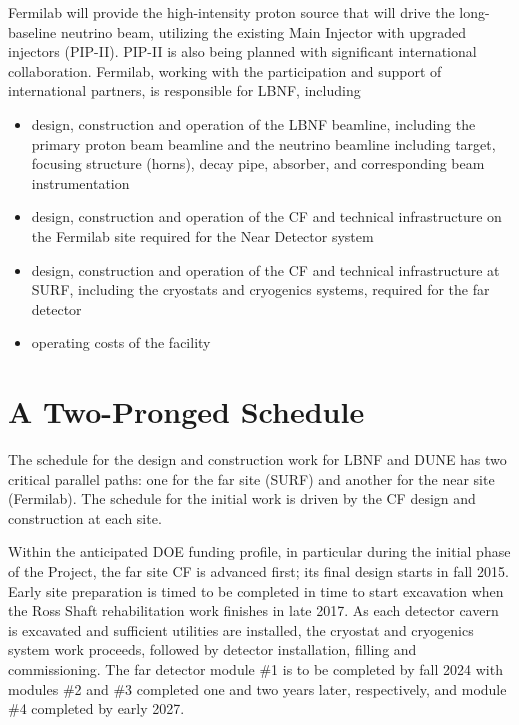 Fermilab will provide the high-intensity proton source that will drive the long-baseline neutrino beam, utilizing the existing Main Injector with upgraded injectors (PIP-II).  PIP-II is also being planned with significant international collaboration.  Fermilab, working %
with the participation and support of international partners, is responsible for %
LBNF, including
\begin{itemize}
\item design, construction and operation of the LBNF beamline, including the primary proton beam beamline and the neutrino beamline including target, focusing structure (horns), decay pipe, absorber, and corresponding beam instrumentation
\item design, construction and operation of the CF and technical infrastructure on the Fermilab site required for the Near Detector system
\item design, construction and operation of the CF and technical infrastructure %
at SURF, including the cryostats and cryogenics systems, required for the far detector
\item %
operating costs of the facility
\end{itemize}


\section{A Two-Pronged Schedule} %

The schedule for the design and construction work for LBNF and DUNE has two critical parallel paths: one for the %
far site (SURF) and %
another for the %
near site (Fermilab). The schedule for the initial work is driven by the CF design and construction at each site. 

Within the anticipated DOE funding profile, in particular during the initial phase of the Project, the far site CF is advanced first; its final design starts in fall 2015. Early site preparation is timed to be completed %
in time to start excavation when the Ross Shaft rehabilitation work finishes %
 in late 2017. As each detector %
 cavern is excavated and sufficient utilities are installed, the cryostat and cryogenics system work proceeds, followed by detector installation, filling and commissioning. 
 The far detector module \#1 is to be completed by fall 2024 with modules \#2 and \#3 completed
 one and two years later, respectively, and module \#4 completed by early 2027.

